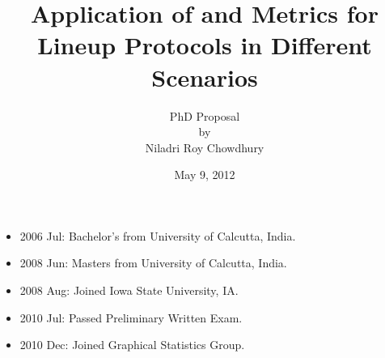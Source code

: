 \documentclass{beamer}
\begin{document}
\title[PhD Proposal]{Application of and Metrics for Lineup Protocols in Different Scenarios }
\author[N. Roy Chowdhury]{PhD Proposal \\ by \\Niladri Roy Chowdhury}
\date[May 9]{May 9, 2012}


\begin{frame}
	\maketitle
\end{frame}

\begin{frame}
	\begin{itemize}
			  \item 2006 Jul: Bachelor's from University of Calcutta, India.
		\item 2008 Jun: Masters from University of Calcutta, India.
		\item 2008 Aug: Joined Iowa State University, IA.
		\item 2010 Jul: Passed Preliminary Written Exam.
		\item 2010 Dec: Joined Graphical Statistics Group.
	\end{itemize}		
\end{frame}
\end{document}
